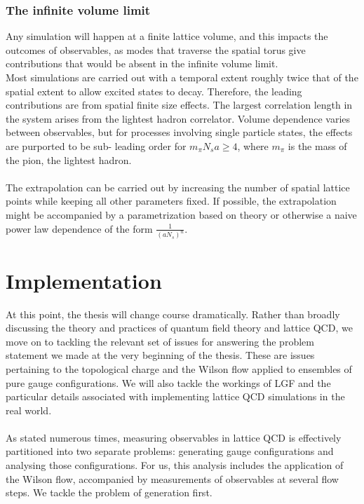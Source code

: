 \documentclass[a4paper,10pt]{book}
\begin{document}
\subsection{The infinite volume limit}
Any simulation will happen at a finite lattice volume, and this impacts the outcomes of observables, as modes that traverse the spatial torus give contributions that would be absent in the infinite volume limit.\\Most simulations are carried out with a temporal extent roughly twice that of the spatial extent to allow excited states to decay. Therefore, the leading contributions are from spatial finite size effects. The largest correlation length in the system arises from the lightest hadron correlator. Volume dependence varies between observables, but for processes involving single particle states, the effects are purported to be sub- leading order for $m_\pi N_sa \geq 4$, where $m_\pi$ is the mass of the pion, the lightest hadron.\\\\The extrapolation can be carried out by increasing the number of spatial lattice points while keeping all other parameters fixed. If possible, the extrapolation might be accompanied by a parametrization based on theory or otherwise a naive power law dependence of the form $\frac{1}{(aN_s)^n}$.

\chapter{Implementation}\label{chap:Imp}
At this point, the thesis will change course dramatically. Rather than broadly discussing the theory and practices of quantum field theory and lattice QCD, we move on to tackling the relevant set of issues for answering the problem statement we made at the very beginning of the thesis. These are issues pertaining to the topological charge and the Wilson flow applied to ensembles of pure gauge configurations. We will also tackle the workings of LGF and the particular details associated with implementing lattice QCD simulations in the real world.\\\\As stated numerous times, measuring observables in lattice QCD is effectively partitioned into two separate problems: generating gauge configurations and analysing those configurations. For us, this analysis includes the application of the Wilson flow, accompanied by measurements of observables at several flow steps. We tackle the problem of generation first.
\end{document}
